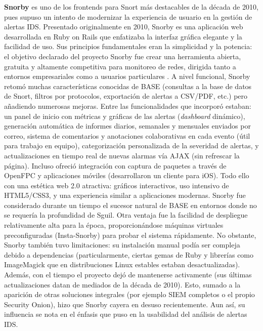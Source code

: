 \documentclass[11pt,a4paper,twoside]{report}
\begin{document}
\textbf{Snorby} es uno de los frontends para Snort más destacables de la década de 2010, pues supuso un intento de modernizar la experiencia de usuario en la gestión de alertas IDS. Presentado originalmente en 2010, Snorby es una aplicación web desarrollada en Ruby on Rails que enfatizaba la interfaz gráfica elegante y la facilidad de uso. Sus principios fundamentales eran la simplicidad y la potencia: el objetivo declarado del proyecto Snorby fue crear una herramienta abierta, gratuita y altamente competitiva para monitoreo de redes, dirigida tanto a entornos empresariales como a usuarios particulares \cite{SnorbyHelpnet2010}. A nivel funcional, Snorby retomó muchas características conocidas de BASE (consultas a la base de datos de Snort, filtros por protocolos, exportación de alertas a CSV/PDF, etc.) pero añadiendo numerosas mejoras. Entre las funcionalidades que incorporó estaban: un panel de inicio con métricas y gráficas de las alertas (\textit{dashboard} dinámico), generación automática de informes diarios, semanales y mensuales enviados por correo, sistema de comentarios y anotaciones colaborativas en cada evento (útil para trabajo en equipo), categorización personalizada de la severidad de alertas, y actualizaciones en tiempo real de nuevas alarmas vía AJAX (sin refrescar la página). Incluso ofreció integración con captura de paquetes a través de OpenFPC y aplicaciones móviles (desarrollaron un cliente para iOS). Todo ello con una estética web 2.0 atractiva: gráficos interactivos, uso intensivo de HTML5/CSS3, y una experiencia similar a aplicaciones modernas. Snorby fue considerado durante un tiempo el sucesor natural de BASE en entornos donde no se requería la profundidad de Sguil. Otra ventaja fue la facilidad de despliegue relativamente alta para la época, proporcionándose máquinas virtuales preconfiguradas (Insta-Snorby) para probar el sistema rápidamente. No obstante, Snorby también tuvo limitaciones: su instalación manual podía ser compleja debido a dependencias (particularmente, ciertas gemas de Ruby y librerías como ImageMagick que en distribuciones Linux estables estaban desactualizadas). Además, con el tiempo el proyecto dejó de mantenerse activamente (sus últimas actualizaciones datan de mediados de la década de 2010). Esto, sumado a la aparición de otras soluciones integrales (por ejemplo SIEM completos o el propio Security Onion), hizo que Snorby cayera en desuso recientemente. Aun así, su influencia se nota en el énfasis que puso en la usabilidad del análisis de alertas IDS.\newline
\end{document}
